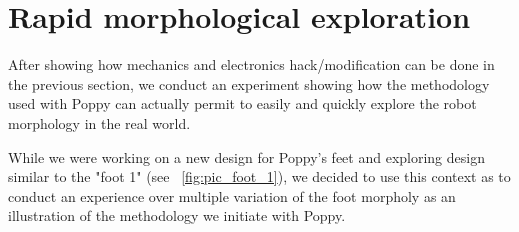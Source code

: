 
\newpage
\section{Rapid morphological exploration} %
\label{sec:morphology-variable}

After showing how mechanics and electronics hack/modification can be done in the previous section, we conduct an experiment showing how the methodology used with Poppy can actually permit to easily and quickly explore the robot morphology in the real world.

While we were working on a new design for Poppy's feet and exploring design similar to the "foot 1" (see \figurename~\ref{fig:pic_foot_1}), we decided to use this context as to conduct an experience over multiple variation of the foot morpholy as an illustration of the methodology we initiate with Poppy.

\begin{figure}[!b]
\centering
    \hfil
    \\
    \hfil
    \caption{}
    \label{fig:foot_variants}
\end{figure}


